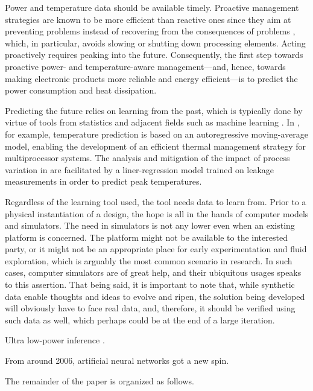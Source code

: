 Power and temperature data should be available timely. Proactive management
strategies are known to be more efficient than reactive ones since they aim at
preventing problems instead of recovering from the consequences of problems
\cite{coskun2008, chaudhry2015}, which, in particular, avoids slowing or
shutting down processing elements. Acting proactively requires peaking into the
future. Consequently, the first step towards proactive power- and
temperature-aware management---and, hence, towards making electronic products
more reliable and energy efficient---is to predict the power consumption and
heat dissipation.

Predicting the future relies on learning from the past, which is typically done
by virtue of tools from statistics and adjacent fields such as machine learning
\cite{bishop2006}. In \cite{coskun2008}, for example, temperature prediction is
based on an autoregressive moving-average model, enabling the development of an
efficient thermal management strategy for multiprocessor systems. The analysis
and mitigation of the impact of process variation in \cite{juan2014} are
facilitated by a liner-regression model trained on leakage measurements in order
to predict peak temperatures.

Regardless of the learning tool used, the tool needs data to learn from. Prior
to a physical instantiation of a design, the hope is all in the hands of
computer models and simulators. The need in simulators is not any lower even
when an existing platform is concerned. The platform might not be available to
the interested party, or it might not be an appropriate place for early
experimentation and fluid exploration, which is arguably the most common
scenario in research. In such cases, computer simulators are of great help, and
their ubiquitous usages speaks to this assertion. That being said, it is
important to note that, while synthetic data enable thoughts and ideas to evolve
and ripen, the solution being developed will obviously have to face real data,
and, therefore, it should be verified using such data as well, which perhaps
could be at the end of a large iteration.

Ultra low-power inference \cite{park2015}.

From around 2006, artificial neural networks got a new spin.

The remainder of the paper is organized as follows.
